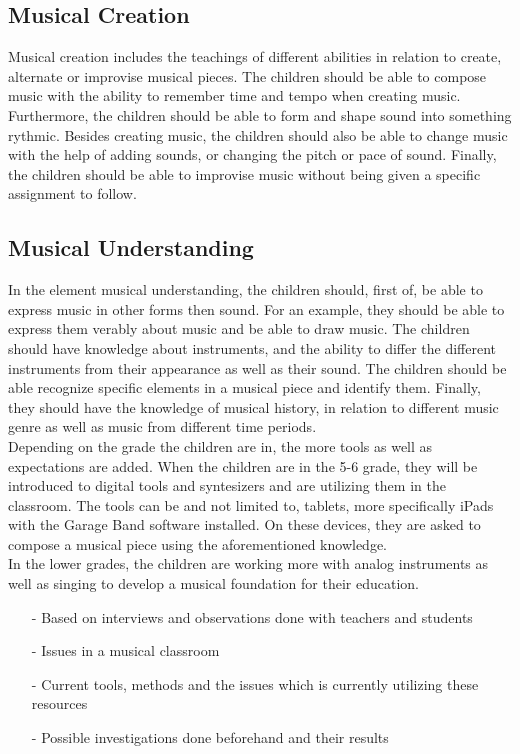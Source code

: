 	\subsection*{Musical Creation}
	Musical creation includes the teachings of different abilities in relation to create, alternate or improvise musical pieces. The children should be able to compose music with the ability to remember time and tempo when creating music. Furthermore, the children should be able to form and shape sound into something rythmic. Besides creating music, the children should also be able to change music with the help of adding sounds, or changing the pitch or pace of sound. Finally, the children should be able to improvise music without being given a specific assignment to follow.
	
	\subsection*{Musical Understanding}
	In the element musical understanding, the children should, first of, be able to express music in other forms then sound. For an example, they should be able to express them verably about music and be able to draw music. The children should have knowledge about instruments, and the ability to differ the different instruments from their appearance as well as their sound. The children should be able recognize specific elements in a musical piece and identify them. Finally, they should have the knowledge of musical history, in relation to different music genre as well as music from different time periods.
	\\
	
	Depending on the grade the children are in, the more tools as well as expectations are added. When the children are in the 5-6 grade, they will be introduced to digital tools and syntesizers and are utilizing them in the classroom. The tools can be and not limited to, tablets, more specifically iPads with the Garage Band software installed. On these devices, they are asked to compose a musical piece using the aforementioned knowledge.\\
	In the lower grades, the children are working more with analog instruments as well as singing to develop a musical foundation for their education.
	\\
\begin{itemize}
	\item[-] Based on interviews and observations done with teachers and students
	\item[-] Issues in a musical classroom
	\item[-] Current tools, methods and the issues which is currently utilizing these resources
	\item[-] Possible investigations done beforehand and their results	
\end{itemize}

